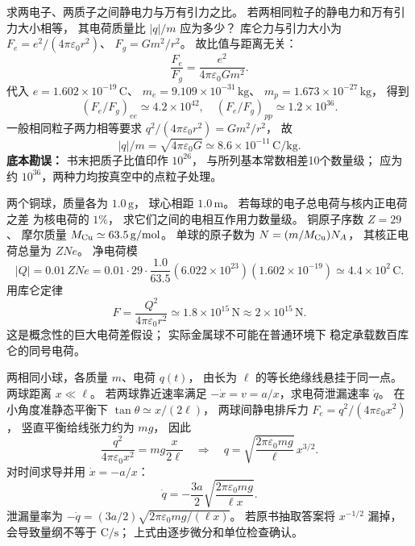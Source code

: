 
求两电子、两质子之间静电力与万有引力之比。
若两相同粒子的静电力和万有引力大小相等，
其电荷质量比 $|q|/m$ 应为多少？
\exsolution
库仑力与引力大小为
$F_e=e^2/(4\pi\varepsilon_0r^2)$、
$F_g=Gm^2/r^2$。
故比值与距离无关：
\[
\frac{F_e}{F_g}=\frac{e^2}{4\pi\varepsilon_0 Gm^2}.
\]
代入 $e=1.602\times10^{-19}\,\mathrm C$、
$m_e=9.109\times10^{-31}\,\mathrm{kg}$、
$m_p=1.673\times10^{-27}\,\mathrm{kg}$，
得到
\[
\boxed{(F_e/F_g)_{ee}\simeq4.2\times10^{42}},\quad
\boxed{(F_e/F_g)_{pp}\simeq1.2\times10^{36}}.
\]
一般相同粒子两力相等要求
$q^2/(4\pi\varepsilon_0r^2)=Gm^2/r^2$，
故
\[
\boxed{|q|/m=\sqrt{4\pi\varepsilon_0G}
\simeq8.6\times10^{-11}\,\mathrm{C/kg}}.
\]
\excheck \textbf{底本勘误：}
书末把质子比值印作 $10^{26}$，
与所列基本常数相差10个数量级；
应为约 $10^{36}$，两种力均按真空中的点粒子处理。

两个铜球，质量各为 $1.0\,\mathrm g$，
球心相距 $1.0\,\mathrm m$。
若每球的电子总电荷与核内正电荷之差
为核电荷的 $1\%$，
求它们之间的电相互作用力数量级。
\exsolution
铜原子序数 $Z=29$、
摩尔质量 $M_{\rm Cu}\simeq63.5\,\mathrm{g/mol}$。
单球的原子数为
$N=(m/M_{\rm Cu})N_A$，
其核正电荷总量为 $ZNe$。
净电荷模
\[
|Q|=0.01\,ZNe
=0.01\cdot29\cdot\frac{1.0}{63.5}
(6.022\times10^{23})(1.602\times10^{-19})
\simeq4.4\times10^2\,\mathrm C.
\]
用库仑定律
\[
\boxed{F=\frac{Q^2}{4\pi\varepsilon_0r^2}
\simeq1.8\times10^{15}\,\mathrm N
\approx2\times10^{15}\,\mathrm N}.
\]
\excheck 这是概念性的巨大电荷差假设；
实际金属球不可能在普通环境下
稳定承载数百库仑的同号电荷。

两相同小球，各质量 $m$、电荷 $q(t)$，
由长为 $\ell$ 的等长绝缘线悬挂于同一点。
两球距离 $x\ll\ell$。
若两球靠近速率满足
$-\dot x=v=a/x$，求电荷泄漏速率 $\dot q$。
\exsolution
在小角度准静态平衡下
$\tan\theta\simeq x/(2\ell)$，
两球间静电排斥力
$F_e=q^2/(4\pi\varepsilon_0x^2)$，
竖直平衡给线张力约为 $mg$，
因此
\[
\frac{q^2}{4\pi\varepsilon_0x^2}
=mg\frac{x}{2\ell}
\quad\Longrightarrow\quad
q=\sqrt{\frac{2\pi\varepsilon_0mg}{\ell}}\,
x^{3/2}.
\]
对时间求导并用 $\dot x=-a/x$：
\[
\boxed{\dot q=
-\frac{3a}{2}
\sqrt{\frac{2\pi\varepsilon_0mg}{\ell x}}}.
\]
泄漏量率为
$-\dot q=(3a/2)\sqrt{2\pi\varepsilon_0mg/(\ell x)}$。
\excheck 若原书抽取答案将 $x^{-1/2}$ 漏掉，
会导致量纲不等于 $\mathrm{C/s}$；
上式由逐步微分和单位检查确认。

